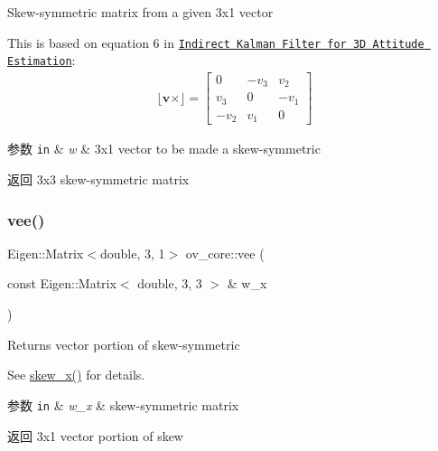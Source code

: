 Skew-\/symmetric matrix from a given 3x1 vector 

This is based on equation 6 in \href{http://mars.cs.umn.edu/tr/reports/Trawny05b.pdf}{\tt Indirect Kalman Filter for 3D Attitude Estimation}\+: \begin{align*} \lfloor\mathbf{v}\times\rfloor = \begin{bmatrix} 0 & -v_3 & v_2 \\ v_3 & 0 & -v_1 \\ -v_2 & v_1 & 0 \end{bmatrix} \end{align*}


\begin{DoxyParams}[1]{参数}
\mbox{\tt in}  & {\em w} & 3x1 vector to be made a skew-\/symmetric \\
\hline
\end{DoxyParams}
\begin{DoxyReturn}{返回}
3x3 skew-\/symmetric matrix 
\end{DoxyReturn}
\mbox{\label{namespaceov__core_aaf2593d3bde63e31ac9fc20e345271dc}} 
\subsubsection{\texorpdfstring{vee()}{vee()}}
{\footnotesize\ttfamily Eigen\+::\+Matrix$<$double, 3, 1$>$ ov\+\_\+core\+::vee (\begin{DoxyParamCaption}\item[{const Eigen\+::\+Matrix$<$ double, 3, 3 $>$ \&}]{w\+\_\+x }\end{DoxyParamCaption})\hspace{0.3cm}{\ttfamily [inline]}}



Returns vector portion of skew-\/symmetric 

See \hyperlink{namespaceov__core_a24012c54df35621a935655b2e230169d}{skew\+\_\+x()} for details.


\begin{DoxyParams}[1]{参数}
\mbox{\tt in}  & {\em w\+\_\+x} & skew-\/symmetric matrix \\
\hline
\end{DoxyParams}
\begin{DoxyReturn}{返回}
3x1 vector portion of skew 
\end{DoxyReturn}
